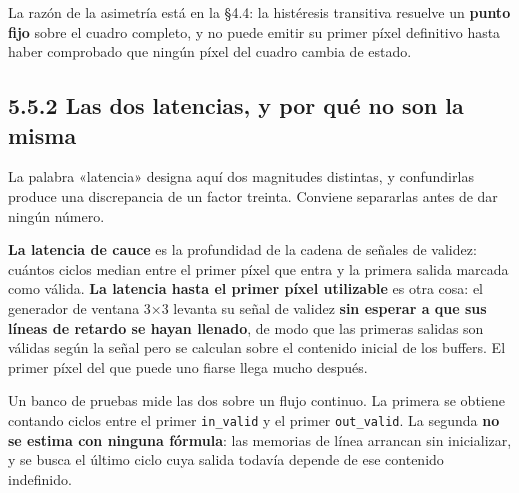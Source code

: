 La razón de la asimetría está en la §4.4: la histéresis transitiva
resuelve un \textbf{punto fijo} sobre el cuadro completo, y no puede
emitir su primer píxel definitivo hasta haber comprobado que ningún
píxel del cuadro cambia de estado.

\subsection{5.5.2 Las dos latencias, y por qué no son la
misma}\label{las-dos-latencias-y-por-quuxe9-no-son-la-misma}

La palabra «latencia» designa aquí dos magnitudes distintas, y
confundirlas produce una discrepancia de un factor treinta. Conviene
separarlas antes de dar ningún número.

\textbf{La latencia de cauce} es la profundidad de la cadena de señales
de validez: cuántos ciclos median entre el primer píxel que entra y la
primera salida marcada como válida. \textbf{La latencia hasta el primer
píxel utilizable} es otra cosa: el generador de ventana 3×3 levanta su
señal de validez \textbf{sin esperar a que sus líneas de retardo se
hayan llenado}, de modo que las primeras salidas son válidas según la
señal pero se calculan sobre el contenido inicial de los buffers. El
primer píxel del que puede uno fiarse llega mucho después.

Un banco de pruebas mide las dos sobre un flujo continuo. La primera se
obtiene contando ciclos entre el primer \texttt{in\_valid} y el primer
\texttt{out\_valid}. La segunda \textbf{no se estima con ninguna
fórmula}: las memorias de línea arrancan sin inicializar, y se busca el
último ciclo cuya salida todavía depende de ese contenido indefinido.

